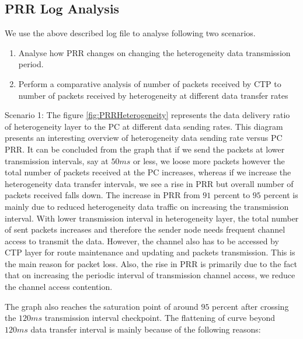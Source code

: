    \subsection*{PRR Log Analysis}

    We use the above described log file to analyse following two scenarios. 
    
    \begin{enumerate}
        \item Analyse how \ac{PRR} changes on changing the heterogeneity data transmission period.
        
        \item Perform a comparative analysis of number of packets received by \ac{CTP} to number of packets received by heterogeneity at different data transfer rates
    \end{enumerate}
    
    
    \par 
    Scenario 1: The figure \ref{fig:PRRHeterogeneity} represents the data delivery ratio of heterogeneity layer to the \ac{PC} at different data sending rates. This diagram presents an interesting overview of heterogeneity data sending rate versus \ac{PC} \ac{PRR}. It can be concluded from the graph that if we send the packets at lower transmission intervals, say at $50ms$ or less, we loose more packets however the total number of packets received at the \ac{PC} increases, whereas if we increase the heterogeneity data transfer intervals, we see a rise in \ac{PRR} but overall number of packets received falls down. The increase in \ac{PRR} from $91$ percent to $95$ percent is mainly due to reduced heterogeneity data traffic on increasing the transmission interval. With lower transmission interval in heterogeneity layer, the total number of sent packets increases and therefore the sender node needs frequent channel access to transmit the data. However, the channel also has to be accessed by \ac{CTP} layer for route maintenance and updating and packets transmission. This is the main reason for packet loss. Also, the rise in \ac{PRR} is primarily due to the fact that on increasing the periodic interval of transmission channel access, we reduce the channel access contention.
    
    \par
    The graph also reaches the saturation point of around $95$ percent after crossing the $120ms$ transmission interval checkpoint. The flattening of curve beyond $120ms$ data transfer interval is mainly because of the following reasons:
        
